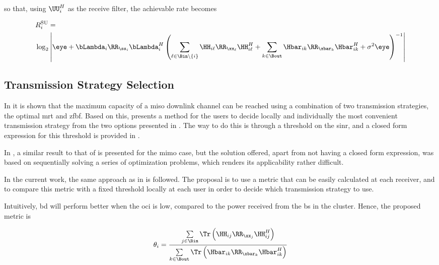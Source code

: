 \noindent
so that, using $\UU_i^H$ as the receive filter, the achievable rate becomes

\begin{equation} \label{eq:rate_su}
\begin{aligned}
    &R_i^{\text{SU}} = \\
    &\log_2\left|\eye + \bLambda_i \RR_{\ss_i} \bLambda_i^H \left(
    \sum\limits_{\ell \in \Bin \backslash \left\{i\right\}} \HH_{i\ell}
    \RR_{\xx_{\ell}} \HH_{i\ell}^H + \sum\limits_{k \in \Bout} \Hbar_{ik}
    \RR_{\xbar_k} \Hbar_{ik}^H + \sigma^2 \eye \right)^{-1} \right|
\end{aligned}
\end{equation}

\subsection{Transmission Strategy Selection} \label{ssec:sched_selection}

In \cite{zhang10} it is shown that the maximum capacity of a \gls{miso} downlink
channel can be reached using a combination of two transmission strategies, the
optimal \gls{mrt} and \gls{zfbf}. Based on this, \cite{moon13} presents a method
for the users to decide locally and individually the most convenient
transmission strategy from the two options presented in \cite{zhang10}. The way
to do this is through a threshold on the \gls{sinr}, and a closed form
expression for this threshold is provided in \cite{moon13}.

In \cite{zuleita09}, a similar result to that of \cite{zhang10} is presented for
the \gls{mimo} case, but the solution offered, apart from not having a closed
form expression, was based on sequentially solving a series of optimization
problems, which renders its applicability rather difficult.

In the current work, the same approach as in \cite{moon13} is followed. The
proposal is to use a metric that can be easily calculated at each receiver, and
to compare this metric with a fixed threshold locally at each user in order to
decide which transmission strategy to use.

Intuitively, \gls{bd} will perform better when the \gls{oci} is low, compared to
the power received from the \gls{bs} in the cluster. Hence, the proposed metric
is

\begin{equation} \label{eq:metric}
   \theta_i =
   \frac{\sum\limits_{j \in \Bin} \Tr\left(\HH_{ij}\RR_{\xx_j}\HH_{ij}^H\right)}
   {\sum\limits_{k \in \Bout} \Tr\left(\Hbar_{ik}\RR_{\xbar_k}\Hbar_{ik}^H
   \right)}
\end{equation}

